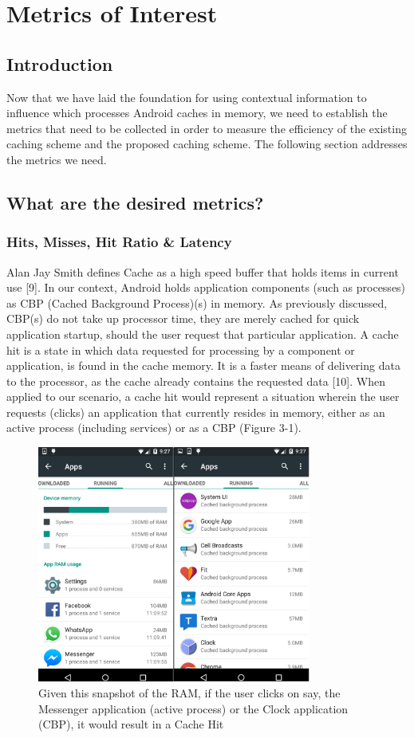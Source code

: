 \documentclass[12pt]{uthesis-v12}  %
\begin{document}
\chapter{Metrics of Interest}
	
	\section{Introduction}
		Now that we have laid the foundation for using contextual information to influence which processes Android caches in memory, we need to establish the metrics that need to be collected in order to measure the efficiency of the existing caching scheme and the proposed caching scheme. The following section addresses the metrics we need.
	
	\section{What are the desired metrics?}
		
		\subsection{Hits, Misses, Hit Ratio \& Latency}
			Alan Jay Smith defines Cache as a high speed buffer that holds items in current use [9]. In our context, Android holds application components (such as processes) as CBP (Cached Background Process)(s) in memory. As previously discussed, CBP(s) do not take up processor time, they are merely cached for quick application startup, should the user request that particular application. A cache hit is a state in which data requested for processing by a component or application, is found in the cache memory. It is a faster means of delivering data to the processor, as the cache already contains the requested data [10]. When applied to our scenario, a cache hit would represent a situation wherein the user requests (clicks) an application that currently resides in memory, either as an active process (including services) or as a CBP (Figure 3-1).  
			
			\begin{figure}[!ht]
				\centering
				\includegraphics[width = 90mm]{images/runningApps.png}
				\caption[Running Applications and CBP(s) - Cache Hit]
				{Given this snapshot of the RAM, if the user clicks on say, the Messenger application (active process) or the Clock application (CBP), it would result in a Cache Hit}
			\end{figure}
			
\end{document}
